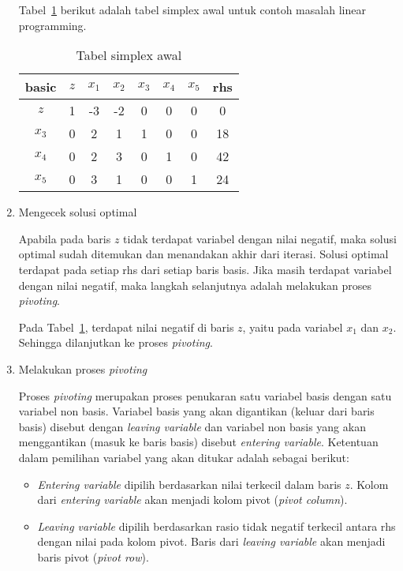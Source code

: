 \begin{enumerate}
		Tabel~\ref{tab:contoh_simplex_awal} berikut adalah tabel simplex awal untuk contoh masalah linear programming.
			
		\begin{table}[H]
			\centering
			\caption{Tabel simplex awal}
			\label{tab:contoh_simplex_awal}
			\begin{tabular}{|c|c|c c c c c|c|}
				\hline
				basic & $z$ & $x_1$ & $x_2$ & $x_3$ & $x_4$ & $x_5$ & rhs \\
				\hline
				$z$ & 1 & -3 & -2 & 0 & 0 & 0 & 0 \\
				\hline
				$x_3$ & 0 & 2 & 1 & 1 & 0 & 0 & 18\\
				$x_4$ & 0 & 2 & 3 & 0 & 1 & 0 & 42\\
				$x_5$ & 0 & 3 & 1 & 0 & 0 & 1 & 24\\
				\hline
			\end{tabular}
		\end{table}

	\item Mengecek solusi optimal
	
    	Apabila pada baris $z$ tidak terdapat variabel dengan nilai negatif, maka solusi optimal sudah ditemukan dan menandakan akhir dari iterasi. Solusi optimal terdapat pada setiap rhs dari setiap baris basis. Jika masih terdapat variabel dengan nilai negatif, maka langkah selanjutnya adalah melakukan proses \textit{pivoting}.

		Pada Tabel~\ref{tab:contoh_simplex_awal}, terdapat nilai negatif di baris $z$, yaitu pada variabel $x_1$ dan $x_2$. Sehingga dilanjutkan ke proses \textit{pivoting}.

	\item Melakukan proses \textit{pivoting}
		
    	Proses \textit{pivoting} merupakan proses penukaran satu variabel basis dengan satu variabel non basis. Variabel basis yang akan digantikan (keluar dari baris basis) disebut dengan \textit{leaving variable} dan variabel non basis yang akan menggantikan (masuk ke baris basis) disebut \textit{entering variable}. Ketentuan dalam pemilihan variabel yang akan ditukar adalah sebagai berikut:

		\begin{itemize}
    		\item \textit{Entering variable} dipilih berdasarkan nilai terkecil dalam baris $z$. Kolom dari \textit{entering variable} akan menjadi kolom pivot (\textit{pivot column}).
    		
    		\item \textit{Leaving variable} dipilih berdasarkan rasio tidak negatif terkecil antara rhs dengan nilai pada kolom pivot. Baris dari \textit{leaving variable} akan menjadi baris pivot (\textit{pivot row}).


\end{itemize}
\end{enumerate}
